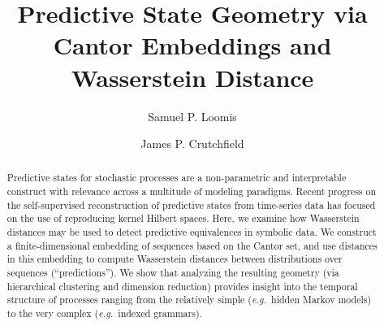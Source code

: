 \documentclass[sigconf, anonymous, review]{acmart}
\begin{document}
\title{Predictive State Geometry via Cantor Embeddings and Wasserstein Distance}
\author{Samuel P. Loomis}

\author{James P. Crutchfield}

\renewcommand{\shortauthors}{Loomis and Crutchfield}

\begin{abstract}
  Predictive states for stochastic processes are a non-parametric and
  interpretable construct with relevance across a multitude of modeling
  paradigms. Recent progress on the self-supervised reconstruction of predictive
  states from time-series data has focused on the use of reproducing kernel
  Hilbert spaces. Here, we examine how Wasserstein distances may be used to
  detect predictive equivalences in symbolic data. We construct a
  finite-dimensional embedding of sequences based on the Cantor set, and use
  distances in this embedding to compute Wasserstein distances between
  distributions over sequences (``predictions''). We show that analyzing the
  resulting geometry (via hierarchical clustering and dimension reduction)
  provides insight into the temporal structure of processes ranging from the
  relatively simple (\emph{e.g.}\ hidden Markov models) to the very complex
  (\emph{e.g.}\ indexed grammars).
\end{abstract}
\end{document}
